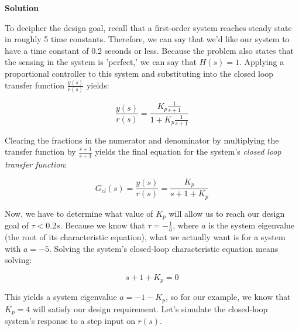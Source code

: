 \documentclass[11pt]{article}
\begin{document}
\textbf{Solution}

To decipher the design goal, recall that a first-order system reaches
steady state in roughly 5 time constants. Therefore, we can say that
we'd like our system to have a time constant of 0.2 seconds or less.
Because the problem also states that the sensing in the system is
'perfect,' we can say that \(H(s)=1\). Applying a proportional
controller to this system and substituting into the closed loop transfer
function \(\frac{y(s)}{r(s)}\) yields:

\begin{equation}
\frac{y(s)}{r(s)} = \frac{K_p\frac{1}{s+1}}{1+K_p\frac{1}{s+1}}
\end{equation}

Clearing the fractions in the numerator and denominator by multiplying
the transfer function by \(\frac{s+1}{s+1}\) yields the final equation
for the system's \emph{closed loop transfer function}:

\begin{equation}
G_{cl}(s) = \frac{y(s)}{r(s)} = \frac{K_p}{s+1+K_p}
\end{equation}

Now, we have to determine what value of \(K_p\) will allow us to reach
our design goal of \(\tau<0.2s\). Because we know that
\(\tau=-\frac{1}{a}\), where \(a\) is the system eigenvalue (the root of
its characteristic equation), what we actually want is for a system with
\(a=-5\). Solving the system's closed-loop characteristic equation means
solving:

\begin{equation}
s+1+K_p=0
\end{equation}

This yields a system eigenvalue \(a=-1-K_p\), so for our example, we
know that \(K_p=4\) will satisfy our design requirement. Let's simulate
the closed-loop system's response to a step input on \(r(s)\).
\end{document}
